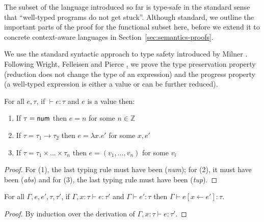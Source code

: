 The subset of the language introduced so far is type-safe in the standard sense that
``well-typed programs do not get stuck''. Although standard, we outline the important parts
of the proof for the functional subset here, before we extend it to concrete context-aware
languages in Section~\ref{sec:semantics-proofs}.

We use the standard syntactic approach to type safety introduced by Milner \cite{syntactic-sml}.
Following Wright, Felleisen and Pierce \cite{syntactic-tapl,syntactic-approach}, we prove the
type preservation property (reduction does not change the type of an expression) and the progress
property (a well-typed expression is either a value or can be further reduced).

\begin{lemma}
\label{thm:semantics-fp-canon}
For all $e, \tau$, if $\vdash e : \tau$ and $e$ is a value then:
\begin{enumerate}
  \item If $\tau=\ident{num}$ then $e = n$ for some $n \in \mathbb{Z}$
  \item If $\tau=\tau_1 \rightarrow \tau_2$ then $e = \lambda x.e'$ for some $x, e'$
  \item If $\tau=\tau_1\times\ldots\times\tau_n$ then $e = (v_1, \ldots, v_n)$ for some $v_i$
\end{enumerate}
\end{lemma}
\begin{proof}
  For (1), the last typing rule must have been (\emph{num}); for (2), it must have been
  (\emph{abs}) and for (3), the last typing rule must have been (\emph{tup}).
\end{proof}

\begin{lemma}
\label{thm:semantics-fp-pres-subst}
For all $\Gamma, e, e', \tau, \tau'$, if $\Gamma, x:\tau \vdash e : \tau'$ and $\Gamma \vdash e' : \tau$
then $\Gamma \vdash e[x \leftarrow e'] : \tau$.
\end{lemma}
\begin{proof}
By induction over the derivation of $\Gamma, x:\tau \vdash e : \tau'$.
\end{proof}

